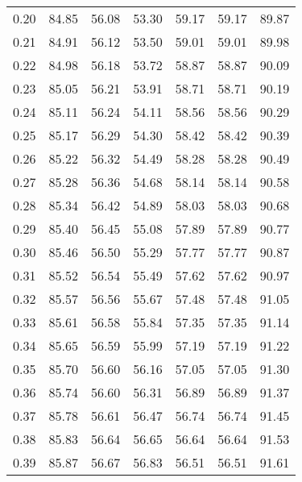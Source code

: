 \begin{tabular}{|c|c|c|c|c|c|c|}
      0.20 &     84.85 &     56.08 &      53.30 &   59.17 &      59.17 &         89.87 \\
      0.21 &     84.91 &     56.12 &      53.50 &   59.01 &      59.01 &         89.98 \\
      0.22 &     84.98 &     56.18 &      53.72 &   58.87 &      58.87 &         90.09 \\
      0.23 &     85.05 &     56.21 &      53.91 &   58.71 &      58.71 &         90.19 \\
      0.24 &     85.11 &     56.24 &      54.11 &   58.56 &      58.56 &         90.29 \\
      0.25 &     85.17 &     56.29 &      54.30 &   58.42 &      58.42 &         90.39 \\
      0.26 &     85.22 &     56.32 &      54.49 &   58.28 &      58.28 &         90.49 \\
      0.27 &     85.28 &     56.36 &      54.68 &   58.14 &      58.14 &         90.58 \\
      0.28 &     85.34 &     56.42 &      54.89 &   58.03 &      58.03 &         90.68 \\
      0.29 &     85.40 &     56.45 &      55.08 &   57.89 &      57.89 &         90.77 \\
      0.30 &     85.46 &     56.50 &      55.29 &   57.77 &      57.77 &         90.87 \\
      0.31 &     85.52 &     56.54 &      55.49 &   57.62 &      57.62 &         90.97 \\
      0.32 &     85.57 &     56.56 &      55.67 &   57.48 &      57.48 &         91.05 \\
      0.33 &     85.61 &     56.58 &      55.84 &   57.35 &      57.35 &         91.14 \\
      0.34 &     85.65 &     56.59 &      55.99 &   57.19 &      57.19 &         91.22 \\
      0.35 &     85.70 &     56.60 &      56.16 &   57.05 &      57.05 &         91.30 \\
      0.36 &     85.74 &     56.60 &      56.31 &   56.89 &      56.89 &         91.37 \\
      0.37 &     85.78 &     56.61 &      56.47 &   56.74 &      56.74 &         91.45 \\
      0.38 &     85.83 &     56.64 &      56.65 &   56.64 &      56.64 &         91.53 \\
      0.39 &     85.87 &     56.67 &      56.83 &   56.51 &      56.51 &         91.61 \\

\end{tabular}
